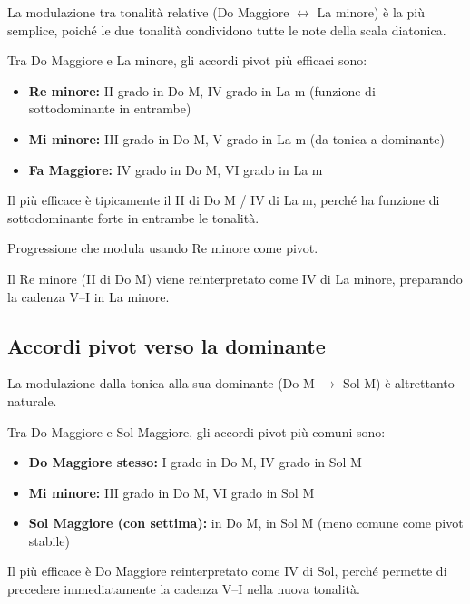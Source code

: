 La modulazione tra tonalità relative (Do Maggiore $\leftrightarrow$ La minore) è la più semplice, poiché le due tonalità condividono tutte le note della scala diatonica.

\begin{regola}
	\label{reg:pivot_relative}
	Tra Do Maggiore e La minore, gli accordi pivot più efficaci sono:
	
	\begin{itemize}
		\item \textbf{Re minore:} II grado in Do M, IV grado in La m (funzione di sottodominante in entrambe)
		\item \textbf{Mi minore:} III grado in Do M, V grado in La m (da tonica a dominante)
		\item \textbf{Fa Maggiore:} IV grado in Do M, VI grado in La m
	\end{itemize}
	
	Il più efficace è tipicamente il II di Do M / IV di La m, perché ha funzione di sottodominante forte in entrambe le tonalità.
\end{regola}

\begin{esempio}
	\label{ex:mod_do_lam}
	Progressione che modula usando Re minore come pivot.

	Il Re minore (II di Do M) viene reinterpretato come IV di La minore, preparando la cadenza V--I in La minore.
\end{esempio}

\subsection{Accordi pivot verso la dominante}
\label{subsec:pivot_dominante}

La modulazione dalla tonica alla sua dominante (Do M $\rightarrow$ Sol M) è altrettanto naturale.

\begin{regola}
	\label{reg:pivot_dominante}
	Tra Do Maggiore e Sol Maggiore, gli accordi pivot più comuni sono:
	
	\begin{itemize}
		\item \textbf{Do Maggiore stesso:} I grado in Do M, IV grado in Sol M
		\item \textbf{Mi minore:} III grado in Do M, VI grado in Sol M
		\item \textbf{Sol Maggiore (con settima):}  in Do M,  in Sol M (meno comune come pivot stabile)
	\end{itemize}
	
	Il più efficace è Do Maggiore reinterpretato come IV di Sol, perché permette di precedere immediatamente la cadenza V--I nella nuova tonalità.
\end{regola}

